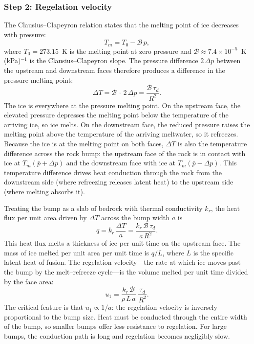 \documentclass[11pt]{article}
\begin{document}
\subsubsection{Step 2: Regelation velocity}

The Clausius--Clapeyron relation states that the melting point of ice decreases with pressure:
\begin{equation}
  T_m = T_0 - \mathcal{B}\,p,
  \label{eq:clausius_clapeyron}
\end{equation}
where $T_0 = 273.15$~K is the melting point at zero pressure and $\mathcal{B} \approx 7.4 \times 10^{-5}$~K\,(kPa)$^{-1}$ is the Clausius--Clapeyron slope.  The pressure difference $2\,\Delta p$ between the upstream and downstream faces therefore produces a difference in the pressure melting point:
\begin{equation}
  \Delta T = \mathcal{B}\,\cdot\,2\,\Delta p = \frac{\mathcal{B}\,\tau_d}{R^2}.
  \label{eq:temp_difference}
\end{equation}
The ice is everywhere at the pressure melting point.  On the upstream face, the elevated pressure depresses the melting point below the temperature of the arriving ice, so ice melts.  On the downstream face, the reduced pressure raises the melting point above the temperature of the arriving meltwater, so it refreezes.  Because the ice is at the melting point on both faces, $\Delta T$ is also the temperature difference across the rock bump: the upstream face of the rock is in contact with ice at $T_m(\bar{p} + \Delta p)$ and the downstream face with ice at $T_m(\bar{p} - \Delta p)$.  This temperature difference drives heat conduction through the rock from the downstream side (where refreezing releases latent heat) to the upstream side (where melting absorbs it).

Treating the bump as a slab of bedrock with thermal conductivity $k_r$, the heat flux per unit area driven by $\Delta T$ across the bump width $a$ is
\begin{equation}
  q = k_r\,\frac{\Delta T}{a} = \frac{k_r\,\mathcal{B}\,\tau_d}{a\,R^2}.
  \label{eq:heat_flux}
\end{equation}
This heat flux melts a thickness of ice per unit time on the upstream face.  The mass of ice melted per unit area per unit time is $q / L$, where $L$ is the specific latent heat of fusion.  The regelation velocity---the rate at which ice moves past the bump by the melt--refreeze cycle---is the volume melted per unit time divided by the face area:
\begin{equation}
  \boxed{u_1 = \frac{k_r\,\mathcal{B}}{\rho\,L\,a}\;\frac{\tau_d}{R^2}.}
  \label{eq:regelation}
\end{equation}
The critical feature is that $u_1 \propto 1/a$: the regelation velocity is inversely proportional to the bump size.  Heat must be conducted through the entire width of the bump, so smaller bumps offer less resistance to regelation.  For large bumps, the conduction path is long and regelation becomes negligibly slow.
\end{document}
